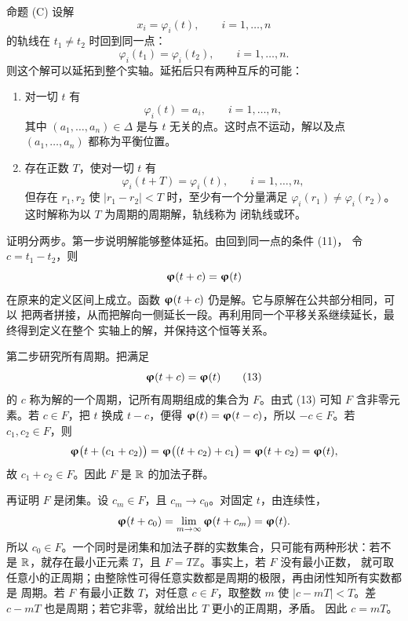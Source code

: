 \begin{sourceitem}{命题 (C)}
设解
\begin{equation}
 x_i=\varphi_i(t),\qquad i=1,\ldots,n
 \tag{11}
\end{equation}
的轨线在 \(t_1\neq t_2\) 时回到同一点：
\begin{equation}
 \varphi_i(t_1)=\varphi_i(t_2),\qquad i=1,\ldots,n.
 \tag{12}
\end{equation}
则这个解可以延拓到整个实轴。延拓后只有两种互斥的可能：
\begin{enumerate}[label=\arabic*.]
 \item 对一切 \(t\) 有
 \[
  \varphi_i(t)=a_i,\qquad i=1,\ldots,n,
 \]
 其中 \((a_1,\ldots,a_n)\in\Delta\) 是与 \(t\) 无关的点。这时点不运动，解以及点
  \((a_1,\ldots,a_n)\) 都称为平衡位置。
 \item 存在正数 \(T\)，使对一切 \(t\) 有
 \[
  \varphi_i(t+T)=\varphi_i(t),\qquad i=1,\ldots,n,
 \]
 但存在 \(r_1,r_2\) 使 \(|r_1-r_2|<T\) 时，至少有一个分量满足
  \(\varphi_i(r_1)\neq\varphi_i(r_2)\)。这时解称为以 \(T\) 为周期的周期解，轨线称为
  闭轨线或环。
\end{enumerate}
\end{sourceitem}

证明分两步。第一步说明解能够整体延拓。由回到同一点的条件 (11)，
令 \(c=t_1-t_2\)，则
\[
 \vect{\varphi}(t+c)=\vect{\varphi}(t)
\]
在原来的定义区间上成立。函数 \(\vect{\varphi}(t+c)\) 仍是解。它与原解在公共部分相同，可以
把两者拼接，从而把解向一侧延长一段。再利用同一个平移关系继续延长，最终得到定义在整个
实轴上的解，并保持这个恒等关系。

第二步研究所有周期。把满足
\begin{equation}
 \vect{\varphi}(t+c)=\vect{\varphi}(t)
 \tag{13}
\end{equation}
的 \(c\) 称为解的一个周期，记所有周期组成的集合为 \(F\)。由式 (13)
可知 \(F\) 含非零元素。若 \(c\in F\)，把 \(t\) 换成 \(t-c\)，便得
\(\vect{\varphi}(t)=\vect{\varphi}(t-c)\)，所以 \(-c\in F\)。若 \(c_1,c_2\in F\)，则
\[
 \vect{\varphi}\bigl(t+(c_1+c_2)\bigr)
 =\vect{\varphi}\bigl((t+c_2)+c_1\bigr)
 =\vect{\varphi}(t+c_2)
 =\vect{\varphi}(t),
\]
故 \(c_1+c_2\in F\)。因此 \(F\) 是 \(\mathbb R\) 的加法子群。

再证明 \(F\) 是闭集。设 \(c_m\in F\)，且 \(c_m\to c_0\)。对固定 \(t\)，由连续性，
\[
 \vect{\varphi}(t+c_0)
 =\lim_{m\to\infty}\vect{\varphi}(t+c_m)
 =\vect{\varphi}(t).
\]
所以 \(c_0\in F\)。一个同时是闭集和加法子群的实数集合，只可能有两种形状：若不是
\(\mathbb R\)，就存在最小正元素 \(T\)，且 \(F=T\mathbb Z\)。事实上，若 \(F\) 没有最小正数，
就可取任意小的正周期；由整除性可得任意实数都是周期的极限，再由闭性知所有实数都是
周期。若 \(F\) 有最小正数 \(T\)，对任意 \(c\in F\)，取整数 \(m\) 使
\(|c-mT|<T\)。差 \(c-mT\) 也是周期；若它非零，就给出比 \(T\) 更小的正周期，矛盾。
因此 \(c=mT\)。

